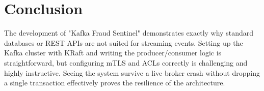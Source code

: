 \documentclass[11pt,a4paper]{article}
\begin{document}
\section{Conclusion}
The development of "Kafka Fraud Sentinel" demonstrates exactly why standard databases or REST APIs are not suited for streaming events. Setting up the Kafka cluster with KRaft and writing the producer/consumer logic is straightforward, but configuring mTLS and ACLs correctly is challenging and highly instructive. Seeing the system survive a live broker crash without dropping a single transaction effectively proves the resilience of the architecture.
\end{document}
